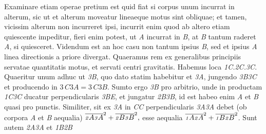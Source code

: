 %
Examinare etiam operae pretium est quid fiat si corpus unum incurrat in alterum, sic ut et alterum moveatur lineaeque motus%
\protect{} sint obliquae; 
%
et tamen, vicissim alterum non incurreret ipsi, incurrit enim quod ab altero etiam quiescente impeditur, fieri enim potest, ut \textit{A} 
%
incurrat in \textit{B}, at \textit{B} tantum raderet \textit{A}, si quiesceret. Videndum est an hoc casu non tantum ipsius \textit{B}, sed et 
%
ipsius \textit{A} %
linea directionis\protect{} a priore divergat. Quaeramus rem ex generalibus principiis servatae quantitatis motus,\protect{}%
\protect{} et servati centri 
%
gravitatis.\protect{}%
\protect{} 
%
Habemus loca \textit{{\scriptsize 1}C.{\scriptsize 2}C.{\scriptsize 3}C}. 
%
Quaeritur unum adhuc ut \textit{{\scriptsize3}B}, quo dato statim habebitur et \textit{{\scriptsize3}A}, 
%
jungendo \textit{{\scriptsize3}B{\scriptsize 3}C} et producendo in ${\scriptstyle\textit{3}\,}C{\scriptstyle\textit{3}}A = 
%
{\scriptstyle\textit{3}\,}C{\scriptstyle\textit{3}}B$. Sumto ergo \textit{{\scriptsize3}B} pro arbitrio, unde in productam
%
 \textit{{\scriptsize 1}C{\scriptsize 3}C} ducatur perpendicularis \textit{{\scriptsize 3}BE}, et jungatur 
%
\textit{{\scriptsize2}B{\scriptsize3}B}, id est 
%
%
habeo enim \textit{A} et \textit{B} quasi pro punctis. Similiter, sit ex \textit{{\scriptsize3}A} in \textit{CC} perpendicularis 
%
%
\textit{{\scriptsize3}A{\scriptsize3}A} 
%
%
debet (ob corpora \textit{A} et \textit{B} aequalia) $\overline{\text{\textit{\scriptsize 2}}A\text{\textit{\scriptsize 3}}A}^2 + \overline{\text{\textit{\scriptsize 2}}B\text{\textit{\scriptsize 3}}B}^2,$ esse aequalia
%
 $\overline{\text{\textit{\scriptsize 1}}A\text{\textit{\scriptsize 2}}A}^2 + \overline{\text{\textit{\scriptsize 1}}B\text{\textit{\scriptsize 2}}B}^2$. 
%
Sunt autem \textit{{\scriptsize2}A{\scriptsize3}A} et \textit{{\scriptsize1}B{\scriptsize2}B} 
